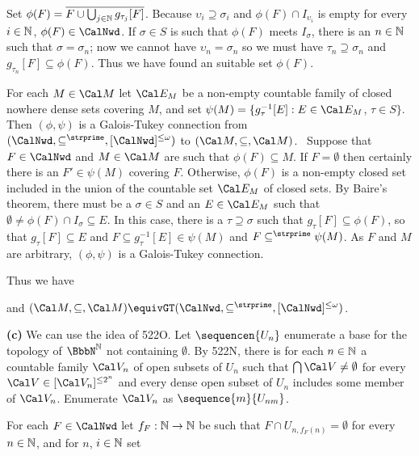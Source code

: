 {Set $\phi(F)=\overline{F\cup\bigcup_{j\in\Bbb N}g_{\tau_j}[F]}$.
Because $\upsilon_i\supseteq\sigma_i$ and $\phi(F)\cap I_{\upsilon_i}$ is
empty for every $i\in\Bbb N$, $\phi(F)\in\CalNwd$.
If $\sigma\in S$ is such that $\phi(F)$ meets $I_{\sigma}$, there is
an $n\in\Bbb N$ such that $\sigma=\sigma_n$;  now we cannot have
$\upsilon_n=\sigma_n$ so we must have
$\tau_n\supseteq\sigma_n$ and $g_{\tau_n}[F]\subseteq\phi(F)$.   Thus we
have found an suitable set $\phi(F)$.\ \Qed

For each $M\in\Cal M$ let $\Cal E_M$ be a non-empty countable family of
closed nowhere dense sets covering $M$, and set
$\psi(M)=\{g_{\tau}^{-1}[E]:E\in\Cal E_M$, $\tau\in S\}$.
Then $(\phi,\psi)$ is a Galois-Tukey connection from
$(\CalNwd,\subseteq^{\strprime},[\CalNwd]^{\le\omega})$ to
$(\Cal M,\subseteq,\Cal M)$.   \Prf\ Suppose that $F\in\CalNwd$ and
$M\in\Cal M$ are such that $\phi(F)\subseteq M$.
If $F=\emptyset$ then certainly there is an $F'\in\psi(M)$ covering $F$.
Otherwise, $\phi(F)$ is a non-empty closed set included in the union of
the countable set $\Cal E_M$ of closed sets.   By Baire's theorem, there
must be a $\sigma\in S$ and an $E\in\Cal E_M$ such that
$\emptyset\ne\phi(F)\cap I_{\sigma}\subseteq E$.
In this case, there is a $\tau\supseteq\sigma$ such that
$g_{\tau}[F]\subseteq\phi(F)$, so that
$g_{\tau}[F]\subseteq E$ and $F\subseteq g_{\tau}^{-1}[E]\in\psi(M)$ and
$F\subseteq^{\strprime}\psi(M)$.   As $F$ and $M$ are arbitrary,
$(\phi,\psi)$ is a Galois-Tukey connection.\ \Qed

\medskip

 Thus we have


\noindent and $(\Cal M,\subseteq,\Cal M)
\equivGT(\CalNwd,\subseteq^{\strprime},[\CalNwd]^{\le\omega})$.

\medskip

{\bf (c)} We can use the idea of 522O.   Let $\sequencen{U_n}$ enumerate
a base for the topology of $\NN$ not containing $\emptyset$.
By 522N, there is for each
$n\in\Bbb N$ a countable family $\Cal V_n$
of open subsets of $U_n$ such that $\bigcap\Cal V\ne\emptyset$ for every
$\Cal V\in[\Cal V_n]^{\le 2^n}$ and every dense open subset of $U_n$
includes some member of $\Cal V_n$.   Enumerate $\Cal V_n$
as $\sequence{m}{U_{nm}}$.

For each $F\in\CalNwd$ let $f_F:\Bbb N\to\Bbb N$ be such that
$F\cap U_{n,f_F(n)}=\emptyset$ for every $n\in\Bbb N$, and for $n$,
$i\in\Bbb N$ set

}
